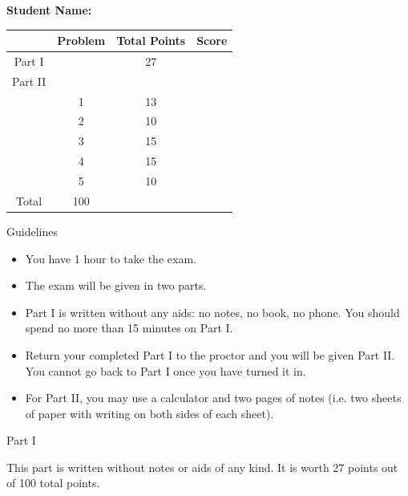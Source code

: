 \documentclass[11pt]{article}
\def\bc{\begin{center}}
\def\ec{\end{center}}
\begin{document}
\thispagestyle{fancy}

\vspace{1in}

\textbf{Student Name:}\hspace{2in}

\vspace{1in}

{
\renewcommand{\baselinestretch}{1.8}
\setlength{\tabcolsep}{.2in}
\normalsize
\begin{center}
\begin{tabular}{|c|c|c|c|}
\hline
&Problem&Total Points&\parbox{.8in}{\hfil Score\hfil}\\
\hline
Part I&&27&\\
\hline
Part II &&&\\
\hline
&1&13&\\
\hline
&2&10&\\
\hline
&3&15&\\
\hline
&4&15&\\
\hline
&5&10&\\
\hline
\hline
Total&100&&\\
\hline
\end{tabular}

\end{center}
}

\vspace{1in} 

Guidelines
\begin{itemize}
\item You have 1 hour to take the exam.
\item The exam will be given in two parts.
\item Part I is written without any aids: no notes, no book, no phone. You should spend no more than 15 minutes on Part I. 
\item Return your completed Part I to the proctor and you will be given Part II. You cannot go back to Part I once you have turned it in.
\item For Part II, you may use a calculator and two pages of notes (i.e. two sheets of paper with writing on both sides of each sheet).
\end{itemize}

\newpage
\vspace*{-0.3in}

\bc Part I \ec

This part is written without notes or aids of any kind. It is worth 27 points out of 100 total points. \\
\end{document}
